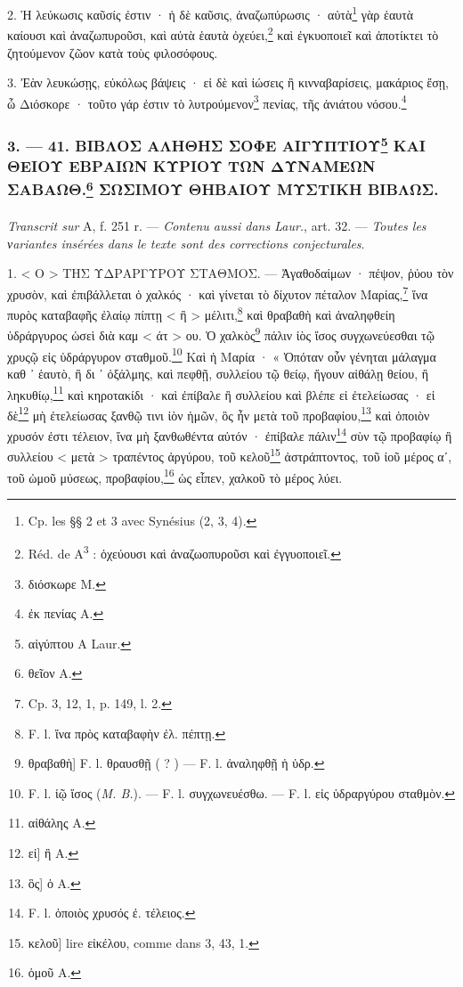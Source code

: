 \documentclass[a4paper, 11pt, oneside, polutonikogreek, french]{article}
\begin{document}
2. Ἡ λεύκωσις καῦσίς ἐστιν · ἡ δὲ καῦσις, ἀναζωπύρωσις · αὐτὰ\footnote{Cp. les §§ 2 et 3 avec Synésius (2, 3, 4).} γὰρ ἑαυτὰ καίουσι καὶ ἀναζωπυροῦσι, καὶ αὐτὰ ἑαυτὰ ὀχεύει,\footnote{Réd. de A\textsuperscript{3} : ὀχεύουσι καὶ ἀναζωοπυροῦσι καὶ ἐγγυοποιεῖ.} καὶ ἐγκυοποιεῖ καὶ ἀποτίκτει τὸ ζητούμενον ζῶον κατὰ τοὺς φιλοσόφους.

3. Ἐὰν λευκώσῃς, εὐκόλως βάψεις · εἰ δὲ καὶ ἰώσεις ἢ κινναβαρίσεις, μακάριος ἔσῃ, ὦ Διόσκορε · τοῦτο γάρ ἐστιν τὸ λυτρούμενον\footnote{διόσκωρε M.} πενίας, τῆς ἀνιάτου νόσου.\footnote{ἐκ πενίας A.}

\bigskip
\centerline{\EightStarTaper}
\centerline{\EightStarTaper\EightStarTaper}
\bigskip

\subsubsection[3. --- 41. ΒΙΒΛΟΣ ΑΛΗΘΗΣ ΣΟΦΕ ΑΙΓΥΠΤΙΟΥ ΚΑΙ ΘΕΙΟΥ ΕΒΡΑΙΩΝ ΚΥΡΙΟΥ ΤΩΝ ΔΥΝΑΜΕΩΝ ΣΑΒΑΩΘ. ΣΩΣΙΜΟΥ ΘΗΒΑΙΟΥ ΜΥΣΤΙΚΗ ΒΙΒΛΩΣ.]{3. --- 41. ΒΙΒΛΟΣ ΑΛΗΘΗΣ ΣΟΦΕ ΑΙΓΥΠΤΙΟΥ\footnote{αἰγύπτου A Laur.} ΚΑΙ ΘΕΙΟΥ ΕΒΡΑΙΩΝ ΚΥΡΙΟΥ ΤΩΝ ΔΥΝΑΜΕΩΝ ΣΑΒΑΩΘ.\footnote{θεῖον A.} ΣΩΣΙΜΟΥ ΘΗΒΑΙΟΥ ΜΥΣΤΙΚΗ ΒΙΒΛΩΣ.}
\paragraph{}
\emph{Transcrit sur} A, f. 251 r. --- \emph{Contenu aussi dans Laur.}, art. 32. --- \emph{Toutes les νariantes insérées dans le texte sont des corrections conjecturales}.

\bigskip

1. < Ο > ΤΗΣ ΥΔΡΑΡΓΥΡΟΥ ΣΤΑΘΜΟΣ. --- Ἀγαθοδαίμων · πέψον, ῥύου τὸν χρυσὸν, καὶ ἐπιβάλλεται ὁ χαλκός · καὶ γίνεται τὸ δίχυτον πέταλον Μαρίας,\footnote{Cp. 3, 12, 1, p. 149, l. 2.} ἵνα πυρὸς καταβαφῆς ἐλαίῳ πίπτῃ < ἢ > μέλιτι,\footnote{F. l. ἵνα πρὸς καταβαφὴν ἐλ. πέπτῃ.} καὶ θραβαθὴ καὶ ἀναληφθείη ὑδράργυρος ὡσεὶ διὰ καμ < άτ > ου. Ὁ χαλκὸς\footnote{θραβαθὴ] F. l. θραυσθῇ ( ? ) --- F. l. ἀναληφθῇ ἡ ὑδρ.} πάλιν ἰὸς ἴσος συγχωνεύεσθαι τῷ χρυςῷ εἰς ὑδράργυρον σταθμοῦ.\footnote{F. l. ἰῷ ἴσος (\emph{M. B.}). --- F. l. συγχωνευέσθω. --- F. l. εἰς ὑδραργύρου σταθμὸν.} Καὶ ἡ Μαρία · « Ὁπόταν οὖν γένηται μάλαγμα καθ ᾽ ἑαυτὸ, ἢ δι ᾽ ὀξάλμης, καὶ πεφθῇ, συλλείου τῷ θείῳ, ἤγουν αἰθάλῃ θείου, ἢ ληκυθίῳ,\footnote{αἰθάλης A.} καὶ κηροτακίδι · καὶ ἐπίβαλε ἢ συλλείου καὶ βλέπε εἰ ἐτελείωσας · εἰ δὲ\footnote{εἰ] ἢ A.} μὴ ἐτελείωσας ξανθῷ τινι ἰὸν ἡμῶν, ὃς ἦν μετὰ τοῦ προβαφίου,\footnote{ὃς] ὁ A.} καὶ ὁποιὸν χρυσόν ἐστι τέλειον, ἵνα μὴ ξανθωθέντα αὐτόν · ἐπίβαλε πάλιν\footnote{F. l. ὁποιὸς χρυσός ἐ. τέλειος.} σὺν τῷ προβαφίῳ ἢ συλλείου < μετὰ > τραπέντος ἀργύρου, τοῦ κελοῦ\footnote{κελοῦ] lire εἰκέλου, comme dans 3, 43, 1.} ἀστράπτοντος, τοῦ ἰοῦ μέρος αʹ, τοῦ ὠμοῦ μύσεως, προβαφίου,\footnote{ὁμοῦ A.} ὡς εἶπεν, χαλκοῦ τὸ μέρος λύει.
\end{document}
